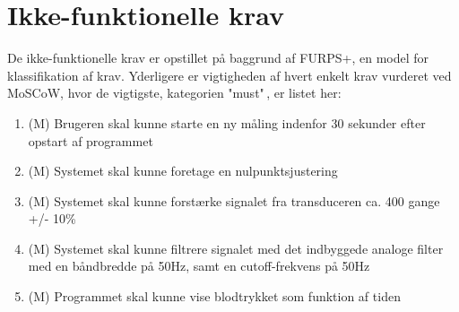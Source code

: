\section{Ikke-funktionelle krav}
De ikke-funktionelle krav er opstillet på baggrund af FURPS+, en model for klassifikation af krav. Yderligere er vigtigheden af hvert enkelt krav vurderet ved MoSCoW, hvor de vigtigste, kategorien "must"\,, er listet her:

\begin{enumerate}
	\item (M) Brugeren skal kunne starte en ny måling indenfor 30 sekunder efter opstart af programmet 
	\item (M) Systemet skal kunne foretage en nulpunktsjustering
	\item (M) Systemet skal kunne forstærke signalet fra transduceren ca. 400 gange +/- 10\%
	\item (M) Systemet skal kunne filtrere signalet med det indbyggede analoge filter med en båndbredde på 50Hz, samt en cutoff-frekvens på 50Hz
	\item (M) Programmet skal kunne vise blodtrykket som funktion af tiden
\end{enumerate}



